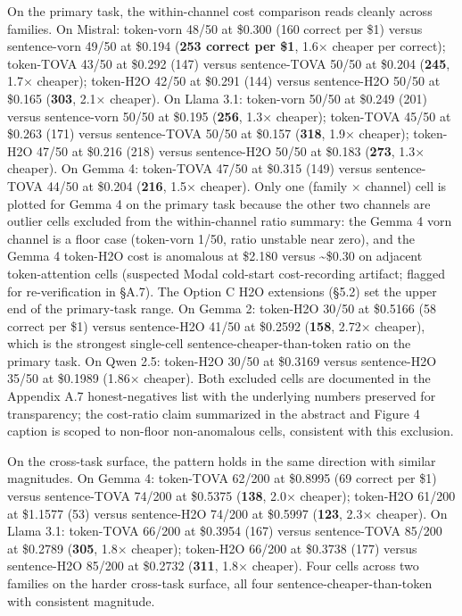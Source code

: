 \documentclass[
]{article}
\begin{document}
On the primary task, the within-channel cost comparison reads cleanly
across families. On Mistral:
token-vorn 48/50 at \$0.300 (160 correct per \$1) versus
sentence-vorn 49/50 at \$0.194 (\textbf{253 correct per \$1}, 1.6×
cheaper per correct); token-TOVA 43/50 at \$0.292 (147) versus
sentence-TOVA 50/50 at \$0.204 (\textbf{245}, 1.7× cheaper);
token-H2O 42/50 at \$0.291 (144) versus sentence-H2O 50/50
at \$0.165 (\textbf{303}, 2.1× cheaper). On Llama 3.1: token-vorn
50/50 at \$0.249 (201) versus sentence-vorn 50/50 at \$0.195
(\textbf{256}, 1.3× cheaper); token-TOVA 45/50 at \$0.263 (171)
versus sentence-TOVA 50/50 at \$0.157 (\textbf{318}, 1.9×
cheaper); token-H2O 47/50 at \$0.216 (218) versus
sentence-H2O 50/50 at \$0.183 (\textbf{273}, 1.3× cheaper). On
Gemma 4: token-TOVA 47/50 at \$0.315 (149) versus
sentence-TOVA 44/50 at \$0.204 (\textbf{216}, 1.5× cheaper). Only
one (family × channel) cell is plotted for Gemma 4 on the primary task
because the other two channels are outlier cells excluded from the
within-channel ratio summary: the Gemma 4 vorn channel is a floor case
(token-vorn 1/50, ratio unstable near zero), and the Gemma 4 token-H2O
cost is anomalous at \$2.180 versus \textasciitilde\$0.30 on adjacent
token-attention cells (suspected Modal cold-start cost-recording
artifact; flagged for re-verification in §A.7). The Option C H2O
extensions (§5.2) set the upper end of the primary-task range. On
Gemma 2: token-H2O 30/50 at \$0.5166 (58 correct per \$1) versus
sentence-H2O 41/50 at \$0.2592 (\textbf{158}, 2.72× cheaper), which
is the strongest single-cell sentence-cheaper-than-token ratio on the
primary task. On Qwen 2.5: token-H2O 30/50 at \$0.3169
versus sentence-H2O 35/50 at \$0.1989 (1.86× cheaper). Both excluded
cells are documented in the Appendix A.7 honest-negatives list with the underlying
numbers preserved for transparency; the cost-ratio claim summarized in
the abstract and Figure 4 caption is scoped to non-floor non-anomalous
cells, consistent with this exclusion.

On the cross-task surface, the
pattern holds in the same direction with similar magnitudes. On Gemma 4: token-TOVA 62/200 at
\$0.8995 (69 correct per \$1) versus sentence-TOVA 74/200 at
\$0.5375 (\textbf{138}, 2.0× cheaper); token-H2O 61/200 at
\$1.1577 (53) versus sentence-H2O 74/200 at \$0.5997
(\textbf{123}, 2.3× cheaper). On Llama 3.1: token-TOVA 66/200
at \$0.3954 (167) versus sentence-TOVA 85/200 at \$0.2789
(\textbf{305}, 1.8× cheaper); token-H2O 66/200 at \$0.3738 (177)
versus sentence-H2O 85/200 at \$0.2732 (\textbf{311}, 1.8×
cheaper). Four cells across two families on the harder cross-task
surface, all four sentence-cheaper-than-token with consistent magnitude.
\end{document}
